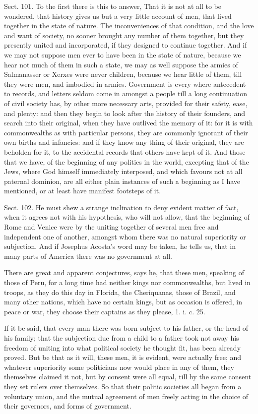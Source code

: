 \documentclass[11pt,openany]{book}
\begin{document}
Sect. 101. To the first there is this to answer, That it is not at all to be wondered, that history gives us but a very little account of men, that lived together in the state of nature. The inconveniences of that condition, and the love and want of society, no sooner brought any number of them together, but they presently united and incorporated, if they designed to continue together. And if we may not suppose men ever to have been in the state of nature, because we hear not much of them in such a state, we may as well suppose the armies of Salmanasser or Xerxes were never children, because we hear little of them, till they were men, and imbodied in armies. Government is every where antecedent to records, and letters seldom come in amongst a people till a long continuation of civil society has, by other more necessary arts, provided for their safety, ease, and plenty: and then they begin to look after the history of their founders, and search into their original, when they have outlived the memory of it: for it is with commonwealths as with particular persons, they are commonly ignorant of their own births and infancies: and if they know any thing of their original, they are beholden for it, to the accidental records that others have kept of it. And those that we have, of the beginning of any polities in the world, excepting that of the Jews, where God himself immediately interposed, and which favours not at all paternal dominion, are all either plain instances of such a beginning as I have mentioned, or at least have manifest footsteps of it.

Sect. 102. He must shew a strange inclination to deny evident matter of fact, when it agrees not with his hypothesis, who will not allow, that the beginning of Rome and Venice were by the uniting together of several men free and independent one of another, amongst whom there was no natural superiority or subjection. And if Josephus Acosta's word may be taken, he tells us, that in many parts of America there was no government at all.

There are great and apparent conjectures, says he, that these men, speaking of those of Peru, for a long time had neither kings nor commonwealths, but lived in troops, as they do this day in Florida, the Cheriquanas, those of Brazil, and many other nations, which have no certain kings, but as occasion is offered, in peace or war, they choose their captains as they please, 1. i. c. 25.

If it be said, that every man there was born subject to his father, or the head of his family; that the subjection due from a child to a father took not away his freedom of uniting into what political society he thought fit, has been already proved. But be that as it will, these men, it is evident, were actually free; and whatever superiority some politicians now would place in any of them, they themselves claimed it not, but by consent were all equal, till by the same consent they set rulers over themselves. So that their politic societies all began from a voluntary union, and the mutual agreement of men freely acting in the choice of their governors, and forms of government.
\end{document}
